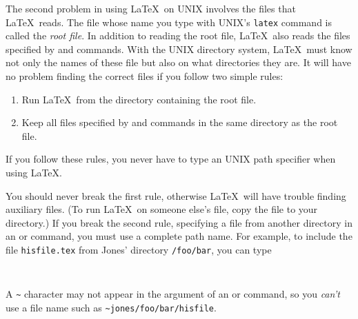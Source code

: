 The second problem in using \LaTeX\ on UNIX involves the files that
\LaTeX\ reads.  The file whose name you type with UNIX's {\tt latex}
command is called the {\em root file}.  In addition to reading the root
file, \LaTeX\ also reads the files specified by \hbox{\verb||}
and \hbox{\verb||} commands.  With the UNIX directory system,
\LaTeX\ must know not only the names of these file but also on what
directories they are.  It will have no problem finding the correct
files if you follow two simple rules:
\begin{enumerate}
 \item Run \LaTeX\ from the directory containing the root file.
 \item Keep all files specified by \hbox{\verb||} and
      \hbox{\verb||} commands in the same directory as the root
       file.
\end{enumerate}
If you follow these rules, you never have to type an UNIX path
specifier when using \LaTeX.

You should never break the first rule, otherwise \LaTeX\ will have
trouble finding auxiliary files.  (To run \LaTeX\ on someone else's
file, copy the file to your directory.) If you break the second
rule, specifying a file from another directory in an
\hbox{\verb||} or \hbox{\verb||} command, you must use a
complete path name.  For example, to include the file \mbox{\tt hisfile.tex}
from Jones' directory \hbox{\verb|/foo/bar|}, you can type
\begin{verbatim}
     
\end{verbatim}
A \verb|~| character may not appear in the argument of an
\hbox{\verb||} or \hbox{\verb||} command, so you {\em
can't\/} use a file name such as \hbox{\verb|~jones/foo/bar/hisfile|}.

